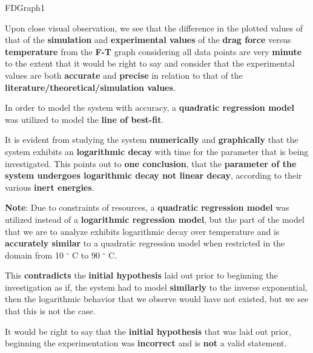 
{FDGraph1}            
            
{Upon close visual observation, we see that the difference in the plotted values of that of the \textbf{simulation} and \textbf{experimental values} of the \textbf{drag force} versus \textbf{temperature} from the \textbf{F-T} graph considering all data points are very \textbf{minute} to the extent that it would be right to say and consider that the experimental values are both \textbf{accurate} and \textbf{precise} in relation to that of the \textbf{literature/theoretical/simulation values}.}

{In order to model the system with accuracy, a \textbf{quadratic regression model} was utilized to model the \textbf{line of best-fit}.}
        
{It is evident from studying the system \textbf{numerically} and \textbf{graphically} that the system exhibits an \textbf{logarithmic decay} with time for the parameter that is being investigated. This points out to \textbf{one conclusion}, that the \textbf{parameter of the system undergoes logarithmic decay not linear decay}, according to their various \textbf{inert energies}.}

{\textbf{Note}: Due to constraints of resources, a \textbf{quadratic regression model} was utilized instead of a \textbf{logarithmic regression model}, but the part of the model that we are to analyze exhibits logarithmic decay over temperature and is \textbf{accurately similar} to a quadratic regression model when restricted in the domain from 10 $^\circ$ C to 90 $^\circ$ C.}
	 
{This \textbf{contradicts} the \textbf{initial hypothesis} laid out prior to beginning the investigation as if, the system had to model \textbf{similarly} to the inverse exponential, then the logarithmic behavior that we observe would have not existed, but we see that this is not the case.}        
        

{It would be right to say that the \textbf{initial hypothesis} that was laid out prior, beginning the experimentation was \textbf{incorrect} and is \textbf{not} a valid statement.}        
    
    

